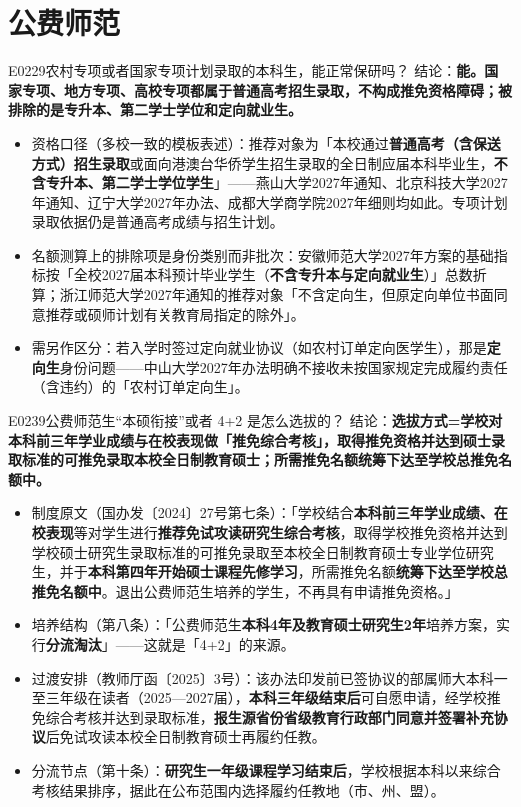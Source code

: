 \section{公费师范}
\begin{qa}{E0229}{农村专项或者国家专项计划录取的本科生，能正常保研吗？}
结论：\textbf{能。国家专项、地方专项、高校专项都属于普通高考招生录取，不构成推免资格障碍；被排除的是专升本、第二学士学位和定向就业生。}
\begin{itemize}
  \item 资格口径（多校一致的模板表述）：推荐对象为「本校通过\textbf{普通高考（含保送方式）招生录取}或面向港澳台华侨学生招生录取的全日制应届本科毕业生，\textbf{不含专升本、第二学士学位学生}」——燕山大学2027年通知、北京科技大学2027年通知、辽宁大学2027年办法、成都大学商学院2027年细则均如此。专项计划录取依据仍是普通高考成绩与招生计划。
  \item 名额测算上的排除项是身份类别而非批次：安徽师范大学2027年方案的基础指标按「全校2027届本科预计毕业学生（\textbf{不含专升本与定向就业生}）」总数折算；浙江师范大学2027年通知的推荐对象「不含定向生，但原定向单位书面同意推荐或硕师计划有关教育局指定的除外」。
  \item 需另作区分：若入学时签过定向就业协议（如农村订单定向医学生），那是\textbf{定向生}身份问题——中山大学2027年办法明确不接收未按国家规定完成履约责任（含违约）的「农村订单定向生」。
\end{itemize}
\end{qa}

\begin{qa}{E0239}{公费师范生“本硕衔接”或者 4+2 是怎么选拔的？}
结论：\textbf{选拔方式=学校对本科前三年学业成绩与在校表现做「推免综合考核」，取得推免资格并达到硕士录取标准的可推免录取本校全日制教育硕士；所需推免名额统筹下达至学校总推免名额中。}
\begin{itemize}
  \item 制度原文（国办发〔2024〕27号第七条）：「学校结合\textbf{本科前三年学业成绩、在校表现}等对学生进行\textbf{推荐免试攻读研究生综合考核}，取得学校推免资格并达到学校硕士研究生录取标准的可推免录取至本校全日制教育硕士专业学位研究生，并于\textbf{本科第四年开始硕士课程先修学习}，所需推免名额\textbf{统筹下达至学校总推免名额中}。退出公费师范生培养的学生，不再具有申请推免资格。」
  \item 培养结构（第八条）：「公费师范生\textbf{本科4年及教育硕士研究生2年}培养方案，实行\textbf{分流淘汰}」——这就是「4+2」的来源。
  \item 过渡安排（教师厅函〔2025〕3号）：该办法印发前已签协议的部属师大本科一至三年级在读者（2025—2027届），\textbf{本科三年级结束后}可自愿申请，经学校推免综合考核并达到录取标准，\textbf{报生源省份省级教育行政部门同意并签署补充协议}后免试攻读本校全日制教育硕士再履约任教。
  \item 分流节点（第十条）：\textbf{研究生一年级课程学习结束后}，学校根据本科以来综合考核结果排序，据此在公布范围内选择履约任教地（市、州、盟）。
\end{itemize}
\end{qa}

